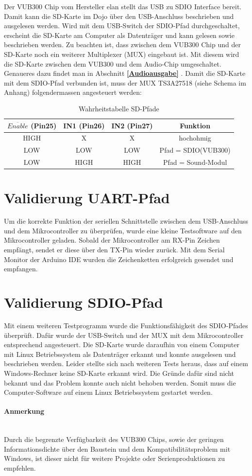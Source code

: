 Der VUB300 Chip vom Hersteller elan stellt das USB zu SDIO Interface bereit. Damit kann die SD-Karte im Dojo über den USB-Anschluss beschrieben und ausgelesen werden. Wird mit dem USB-Switch der SDIO-Pfad durchgeschaltet, erscheint die SD-Karte am Computer als Datenträger und kann gelesen sowie beschrieben werden. Zu beachten ist, dass zwischen dem VUB300 Chip und der SD-Karte noch ein weiterer Multiplexer (MUX) eingebaut ist. Mit diesem wird die SD-Karte zwischen dem VUB300 und dem Audio-Chip umgeschaltet. Genaueres dazu findet man in Abschnitt \textbf{\ref{Audioausgabe} }.
Damit die SD-Karte mit dem SDIO-Pfad verbunden ist, muss der MUX TS3A27518 (siehe Schema im Anhang) folgendermassen angesteuert werden:

\begin{table}[h]
	\centering
	\begin{tabular}{|c|c|c|c|} 
		$\overline{Enable}$ (Pin25) & IN1 (Pin26) & IN2 (Pin27) & Funktion \\ 
		\hline 
		HIGH & X & X & hochohmig \\ 
		\hline 
		LOW & LOW & LOW & Pfad = SDIO(VUB300) \\ 
		\hline 
		LOW & HIGH & HIGH & Pfad = Sound-Modul \\ 
	\end{tabular} 
	\caption{Wahrheitstabelle SD-Pfade}
	\label{truth_table_sd}
\end{table}




\section{Validierung UART-Pfad}

Um die korrekte Funktion der seriellen Schnittstelle zwischen dem USB-Anschluss und dem Mikrocontroller zu überprüfen, wurde eine kleine Testsoftware auf den Mikrocontroller geladen. Sobald der Mikrocontroller am RX-Pin Zeichen empfängt, sendet	er diese über den TX-Pin wieder zurück. Mit dem Serial Monitor der Arduino IDE wurden die Zeichenketten erfolgreich gesendet und empfangen.

\section{Validierung SDIO-Pfad}

Mit einem weiteren Testprogramm wurde die Funktionsfähigkeit des SDIO-Pfades überprüft. Dafür wurde der USB-Switch und der MUX mit dem Mikrocontroller entsprechend angesteuert. Die SD-Karte wurde daraufhin von einem Computer mit Linux Betriebssystem als Datenträger erkannt und konnte ausgelesen und beschrieben werden. Leider stellte sich nach weiteren Tests heraus, dass auf einem Windows-Rechner keine SD-Karte erkannt wird. Die Gründe dafür sind nicht bekannt und das Problem konnte auch nicht behoben werden. Somit muss die Computer-Software auf einem Linux Betriebssystem gestartet werden.
\paragraph{Anmerkung}$ $\\
Durch die begrenzte Verfügbarkeit des VUB300 Chips, sowie der geringen Informationsdichte über den Baustein und dem Kompatibilitätsproblem mit Windows, ist dieser nicht für weitere Projekte oder Serienproduktionen zu empfehlen.